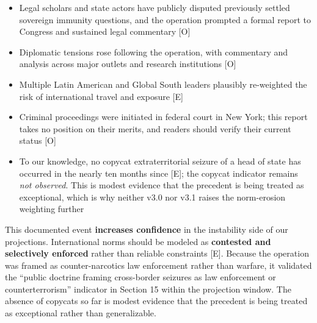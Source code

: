 \documentclass[11pt,letterpaper]{article}
\makeatletter
\newcommand{\etraneed}[1]{\par\if@nobreak\else\penalty\z@\ifdim\pagegoal<\maxdimen\ifdim\dimexpr\pagegoal-\pagetotal\relax<\dimexpr#1\relax\newpage\fi\fi\fi}
\makeatother
\begin{document}
\begin{infobox}
\begin{itemize}
  \item Legal scholars and state actors have publicly disputed previously settled sovereign immunity questions, and the operation prompted a formal report to Congress and sustained legal commentary [O]
  \item Diplomatic tensions rose following the operation, with commentary and analysis across major outlets and research institutions [O]
  \item Multiple Latin American and Global South leaders plausibly re-weighted the risk of international travel and exposure [E]
  \item Criminal proceedings were initiated in federal court in New York; this report takes no position on their merits, and readers should verify their current status [O]
  \item To our knowledge, no copycat extraterritorial seizure of a head of state has occurred in the nearly ten months since [E]; the copycat indicator remains \textit{not observed}. This is modest evidence that the precedent is being treated as exceptional, which is why neither v3.0 nor v3.1 raises the norm-erosion weighting further
\end{itemize}
\end{infobox}

\etraneed{9\baselineskip}
\begin{recbox}
This documented event \textbf{increases confidence} in the instability side of our projections. International norms should be modeled as \textbf{contested and selectively enforced} rather than reliable constraints [E]. Because the operation was framed as counter-narcotics law enforcement rather than warfare, it validated the ``public doctrine framing cross-border seizures as law enforcement or counterterrorism'' indicator in Section 15 within the projection window. The absence of copycats so far is modest evidence that the precedent is being treated as exceptional rather than generalizable.
\end{recbox}
\end{document}
